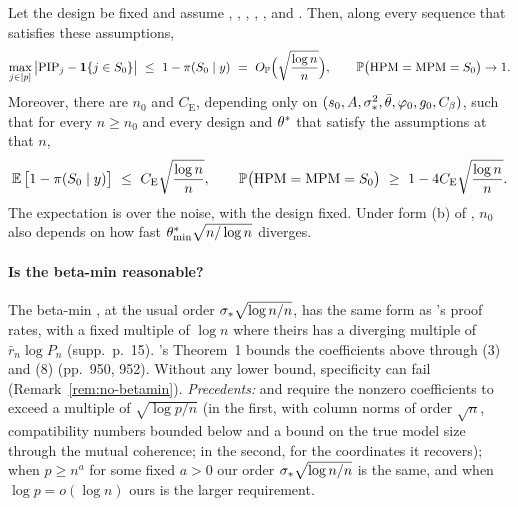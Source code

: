 \begin{theorem}\label{thm:post-fixed}
Let the design be fixed and assume , , , , ,  and . Then, along every
sequence that satisfies these assumptions,
\begin{equation}\label{eq:post-op}
  \max_{j\in\set{p}}\big|\PIP_j-\ind{j\in\Sz}\big|\ \le\ 1-\pis{\Sz}\ =\ \OP\Big(\sqrt{\frac{\log n}{n}}\Big),\qquad
  \P\big(\HPM=\MPM=\Sz\big)\to1 .
\end{equation}
Moreover, there are $n_0$ and $C_{\mathrm E}$, depending only on $(s_0,A,\sigma_*^2,\bar\theta,\varphi_0,g_0,C_\beta)$, such that for
every $n\ge n_0$ and every design and $\theta^*$ that satisfy the assumptions at that $n$,
\begin{equation}\label{eq:post-exp}
  \operatorname{\mathbb{E}}\big[1-\pi(S_0\mid y)\big]\ \le\ C_{\mathrm E}\sqrt{\frac{\log n}{n}},\qquad \mathbb{P}\big(\mathrm{HPM}=\mathrm{MPM}=S_0\big)\ \ge\ 1-4C_{\mathrm E}\sqrt{\frac{\log n}{n}} .
\end{equation}
The expectation is over the noise, with the design fixed. Under form (b) of , $n_0$ also depends on how fast
$\theta^*_{\min}\sqrt{n/\log n}$ diverges.
\end{theorem}



\paragraph{Is the beta-min reasonable?} The beta-min , at the usual order $\sigma_*\sqrt{\log n/n}$, has the same form as \SL's proof rates, with a fixed multiple of
$\log n$ where theirs has a diverging multiple of $\bar r_n\log P_n$ (supp.\ p.~15). \SL's Theorem~1 bounds the
coefficients above through (3) and (8) (pp.~950, 952). Without any lower bound, specificity can fail
(Remark~\ref{rem:no-betamin}).
\emph{Precedents:} \citet[Theorem~5 and Corollary~1, pp.~13--14]{CastilloSchmidtHieberVanDerVaart2015} and
\citet[Theorem~1, display (8), p.~9]{YangWainwrightJordan2015} require the nonzero coefficients to exceed a multiple of
$\sqrt{\log p/n}$ (in the first, with column norms of order $\sqrt n$, compatibility numbers bounded below and a bound on
the true model size through the mutual coherence; in the second, for the coordinates it recovers); when $p\ge n^a$ for some fixed $a>0$ our order $\sigma_*\sqrt{\log n/n}$ is the same, and when $\log p=o(\log n)$ ours is the larger requirement.

